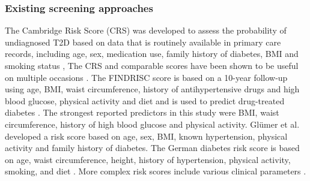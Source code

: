 \fi

%
%

\subsubsection{Existing screening approaches} \label{intro:screening-existing}
The Cambridge Risk Score (CRS) was developed to assess the probability of undiagnosed T2D based on data that is routinely available in primary care records, including age, sex, medication use, family history of diabetes, BMI and smoking status \citep{griffin2000diabetes}, The CRS and comparable scores have been shown to be useful on multiple occasions \citep{baan1999performance,griffin2000diabetes, park2002performance, spijkerman2004performance}. 
The FINDRISC score is based on a 10-year follow-up using age, BMI, waist circumference, history of antihypertensive drugs and high blood glucose, physical activity and diet and is used to predict drug-treated diabetes \citep{lindstrom2003diabetes}. The strongest reported predictors in this study were BMI, waist circumference, history of high blood glucose and physical activity. Gl{\"u}mer et al. \citep{glumer2004danish} developed a risk score based on age, sex, BMI, known hypertension, physical activity and family history of diabetes. The German diabetes risk score is based on age, waist circumference, height, history of hypertension, physical activity, smoking, and diet \citep{schulze2007accurate}.
More complex risk scores include various clinical parameters \citep{heikes2008diabetes, stern2002identification, mcneely2003comparison}.






